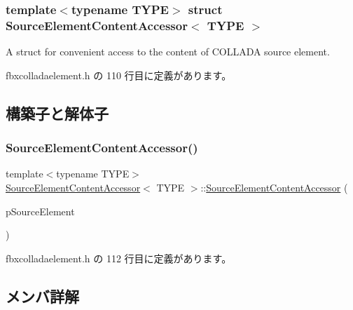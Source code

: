 \subsubsection*{template$<$typename T\+Y\+PE$>$\newline
struct Source\+Element\+Content\+Accessor$<$ T\+Y\+P\+E $>$}

A struct for convenient access to the content of C\+O\+L\+L\+A\+DA source element. 

 fbxcolladaelement.\+h の 110 行目に定義があります。



\subsection{構築子と解体子}
\mbox{\label{struct_source_element_content_accessor_a6eb54cec39e924a3309beb5baefbde93}} 
\subsubsection{\texorpdfstring{Source\+Element\+Content\+Accessor()}{SourceElementContentAccessor()}}
{\footnotesize\ttfamily template$<$typename T\+Y\+PE$>$ \\
\hyperlink{struct_source_element_content_accessor}{Source\+Element\+Content\+Accessor}$<$ T\+Y\+PE $>$\+::\hyperlink{struct_source_element_content_accessor}{Source\+Element\+Content\+Accessor} (\begin{DoxyParamCaption}\item[{xml\+Node $\ast$}]{p\+Source\+Element }\end{DoxyParamCaption})\hspace{0.3cm}{\ttfamily [inline]}}



 fbxcolladaelement.\+h の 112 行目に定義があります。



\subsection{メンバ詳解}
\mbox{\label{struct_source_element_content_accessor_a21c1d4a1c15abe58b0fe1d4114c81f39}} 
